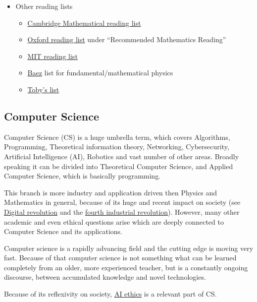 \documentclass{article}
\begin{document}
\begin{itemize}
    \item Other reading lists
    \begin{itemize}
        \item \href{https://www.maths.cam.ac.uk/documents/reading-list.pdf/}{Cambridge Mathematical reading list}
        \item \href{https://www.maths.ox.ac.uk/study-here/undergraduate-study/prospectus}{Oxford reading list} under ``Recommended Mathematics Reading''
        \item \href{https://math.mit.edu/research/highschool/primes/reading.php}{MIT reading list}
        \item \href{http://math.ucr.edu/home/baez/books.html}{Baez} list for fundamental/mathematical physics
        \item \href{https://www.youtube.com/watch?v=I_Df_mx8Hxo}{Toby's list}
    \end{itemize}
    
    
\end{itemize}

\subsection{Computer Science}

Computer Science (CS) is a huge umbrella term, which covers Algorithms, Programming, Theoretical information theory, Networking, Cybersecurity, Artificial Intelligence (AI), Robotics and vast number of other areas.
Broadly speaking it can be divided into Theoretical Computer Science, and Applied Computer Science, which is basically programming.

This branch is more industry and application driven then Physics and Mathematics in general, because of its huge and recent impact on society (see \href{https://en.wikipedia.org/wiki/Digital_Revolution}{Digital revolution} and the  \href{https://www.weforum.org/agenda/2016/01/the-fourth-industrial-revolution-what-it-means-and-how-to-respond/}{fourth industrial revolution}).
However, many other academic and even ethical questions arise which are deeply connected to Computer Science and its applications.

Computer science is a rapidly advancing field and the cutting edge is moving very fast. Because of that computer science is not something what can be learned completely from an older, more experienced teacher, but is a constantly ongoing discourse, between accumulated knowledge and novel technologies.

Because of its reflexivity on society, \href{https://en.wikipedia.org/wiki/Ethics_of_artificial_intelligence}{AI ethics} is a relevant part of CS.
\end{document}
